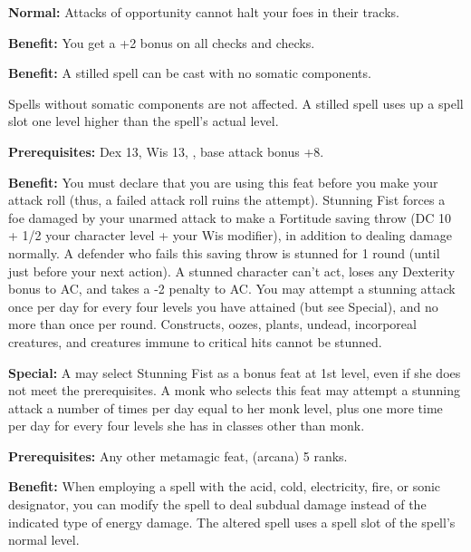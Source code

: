 \textbf{Normal:} Attacks of opportunity cannot halt your foes in their tracks.


\textbf{Benefit:} You get a +2 bonus on all  checks and  checks.


\textbf{Benefit:} A stilled spell can be cast with no somatic components.

Spells without somatic components are not affected. A stilled spell uses up a spell 
slot one level higher than the spell's actual level.


\textbf{Prerequisites:} Dex 13, Wis 13, , base attack bonus 
+8.

\textbf{Benefit:} You must declare that you are using this feat before you make 
your attack roll (thus, a failed attack roll ruins the attempt). Stunning Fist 
forces a foe damaged by your unarmed attack to make a Fortitude saving throw (DC 
10 + 1/2 your character level + your Wis modifier), in addition to dealing damage 
normally. A defender who fails this saving throw is stunned for 1 round (until 
just before your next action). A stunned character can't act, loses any Dexterity 
bonus to AC, and takes a -2 penalty to AC. You may attempt a stunning attack once 
per day for every four levels you have attained (but see Special), and no more 
than once per round. Constructs, oozes, plants, undead, incorporeal creatures, 
and creatures immune to critical hits cannot be stunned.

\textbf{Special:} A  may select Stunning Fist as a bonus feat at 1st level, 
even if she does not meet the prerequisites. A monk who selects this feat may attempt 
a stunning attack a number of times per day equal to her monk level, plus one more 
time per day for every four levels she has in classes other than monk.


\textbf{Prerequisites:} Any other metamagic feat,  (arcana) 5 ranks.

\textbf{Benefit:} When employing a spell with the acid, cold, electricity, fire, 
or sonic designator, you can modify the spell to deal subdual damage instead of 
the indicated type of energy damage. The altered spell uses a spell slot of the 
spell's normal level.

